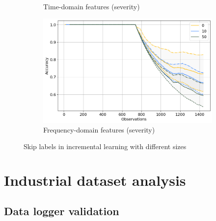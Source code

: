 \begin{figure}[h]
\begin{subfigure}[b]{0.48\textwidth}
        \caption{Time-domain features (severity)}
    \end{subfigure}
    \hfill
    \begin{subfigure}[b]{0.48\textwidth}
        \includegraphics[width=\textwidth]{assets/results/incremental-learning/skip-label-FD-severity.png}
        \caption{Frequency-domain features (severity)}
    \end{subfigure} 
    \caption{Skip labels in incremental learning with different sizes}
\end{figure}



\section{Industrial dataset analysis}

\subsection{Data logger validation}

